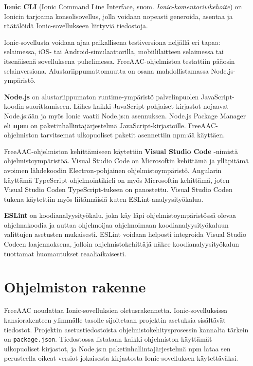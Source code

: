 \documentclass[utf8]{gradu3}
\begin{document}
\textbf{Ionic CLI} (Ionic Command Line Interface, suom. \textit{ Ionic-komentorivikehoite}) on Ionicin tarjoama konsolisovellus, jolla voidaan nopeasti generoida, asentaa ja räätälöidä Ionic\nobreakdash-\hspace{0pt}sovellukseen liittyviä tiedostoja.

Ionic-sovellusta voidaan ajaa paikallisena testiversiona neljällä eri tapaa: selaimessa, iOS- tai Android-simulaattorilla, mobiililaitteen selaimessa tai itsenäisenä sovelluksena puhelimessa. FreeAAC-ohjelmistoa testattiin pääosin selainversiona. Alustariippumattomuutta on osana mahdollistamassa Node.js-ympäristö.

\textbf{Node.js} on alustariippumaton runtime-ympäristö palvelinpuolen JavaScript-koodin suorittamiseen. Lähes kaikki JavaScript-pohjaiset kirjastot nojaavat Node.js:ään ja myös Ionic vaatii Node.js:n asennuksen. Node.js Package Manager eli \textbf{npm} on paketinhallintajärjestelmä JavaScript-kirjastoille. FreeAAC-ohjelmiston tarvitsemat ulkopuoliset paketit asennettiin npm:ää käyttäen.

FreeAAC-ohjelmiston kehittämiseen käytettiin \textbf{Visual Studio Code} -nimistä ohjelmistoympäristöä. Visual Studio Code on Microsoftin kehittämä ja ylläpitämä avoimen lähdekoodin Electron-pohjainen ohjelmistoympäristö. Angularin käyttämä TypeScript-ohjelmointikieli on myös Microsoftin kehittämä, joten Visual Studio Coden TypeScript-tukeen on panostettu. Visual Studio Coden tukena käytettiin myös liitännäisiä kuten ESLint-analyysityökalua.

\textbf{ESLint} on koodianalyysityökalu, joka käy läpi ohjelmistoympäristössä olevaa ohjelmakoodia ja auttaa ohjelmoijaa ohjelmoimaan koodianalyysityökaluun valittujen asetusten mukaisesti. ESLint voidaan helposti integroida Visual Studio Codeen laajennoksena, jolloin ohjelmistokehittäjä näkee koodianalyysityökalun tuottamat huomautukset reaaliaikaisesti.

\section{Ohjelmiston rakenne}

FreeAAC noudattaa Ionic-sovelluksien oletusrakennetta. Ionic-sovelluksissa kansiorakenteen ylimmälle tasolle sijoitetaan projektin asetuksia sisältävät tiedostot. Projektin asetustiedostoista ohjelmistokehitysprosessin kannalta tärkein on \texttt{package.json}. Tiedostossa listataan kaikki ohjelmiston käyttämät ulkopuoliset kirjastot, ja Node.js:n paketinhallintajärjestelmä npm lataa sen perusteella oikeat versiot jokaisesta kirjastosta Ionic-sovelluksen käytettäväksi.
\end{document}
